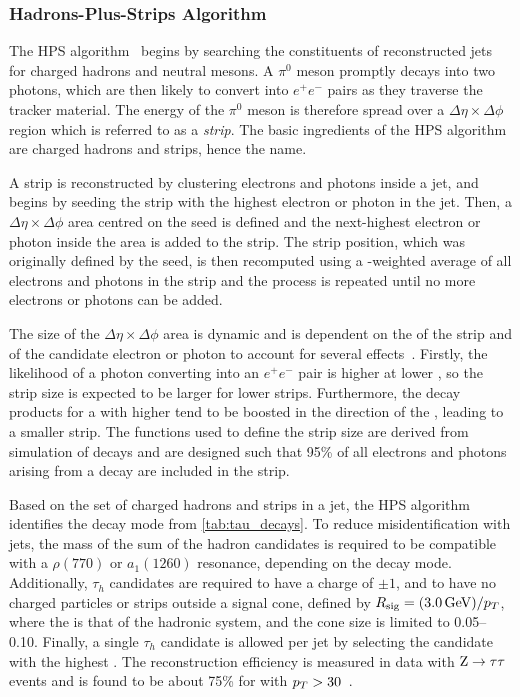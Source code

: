 \subsubsection{Hadrons-Plus-Strips Algorithm}

The HPS algorithm~\cite{CMS:2015pac,CMS:2018jrd} begins by searching the constituents of reconstructed jets for charged hadrons and neutral mesons. A $\pi^0$ meson promptly decays into two photons, which are then likely to convert into $e^+e^-$ pairs as they traverse the tracker material. The energy of the $\pi^0$ meson is therefore spread over a $\Delta\eta \times \Delta\phi$ region which is referred to as a \textit{strip}. The basic ingredients of the HPS algorithm are charged hadrons and strips, hence the name.

A strip is reconstructed by clustering electrons and photons inside a jet, and begins by seeding the strip with the highest \pt electron or photon in the jet. Then, a $\Delta\eta \times \Delta\phi$ area centred on the seed is defined and the next-highest \pt electron or photon inside the area is added to the strip. The strip position, which was originally defined by the seed, is then recomputed using a \pt-weighted average of all electrons and photons in the strip and the process is repeated until no more electrons or photons can be added.

The size of the $\Delta\eta \times \Delta\phi$ area is dynamic and is dependent on the \pt of the strip and of the candidate electron or photon to account for several effects~\cite{CMS:2018jrd}. Firstly, the likelihood of a photon converting into an $e^+e^-$ pair is higher at lower \pt, so the strip size is expected to be larger for lower \pt strips. Furthermore, the decay products for a \tauh with higher \pt tend to be boosted in the direction of the \tauh, leading to a smaller strip. The functions used to define the strip size are derived from simulation of \tauh decays and are designed such that 95\% of all electrons and photons arising from a \tauh decay are included in the strip.

Based on the set of charged hadrons and strips in a jet, the HPS algorithm identifies the decay mode from \cref{tab:tau_decays}. To reduce misidentification with jets, the mass of the sum of the hadron candidates is required to be compatible with a $\rho(770)$ or $a_1(1260)$ resonance, depending on the decay mode. Additionally, $\tau_h$ candidates are required to have a charge of $\pm1$, and to have no charged particles or strips outside a signal cone, defined by $R_{\text{sig}} = (3.0\,\text{Ge\hspace{-.08em}V})/p_T$, where the \pt is that of the hadronic system, and the cone size is limited to 0.05--0.10. Finally, a single $\tau_h$ candidate is allowed per jet by selecting the candidate with the highest \pt. The \tauh reconstruction efficiency is measured in data with $\mathrm{Z}\to\tau\tau$ events and is found to be about 75\% for \tauh with $p_T > 30$\GeV~\cite{CMS:2022prd}. 

